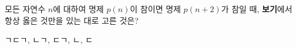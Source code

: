 \hspace*{2mm}\begin{minipage}[t]{\dimexpr\linewidth-2mm\relax}\vspace{0pt}
모든 자연수 $n$에 대하여 명제 $p(n)$이 참이면 명제 $p(n+2)$가 참일 때, \textbf{보기}에서 항상 옳은 것만을 있는 대로 고른 것은?  
\begin{choices32}{ㄱ}{ㄷ}{ㄱ, ㄴ}{ㄱ, ㄷ}{ㄱ, ㄴ, ㄷ}\end{choices32}\end{minipage}
